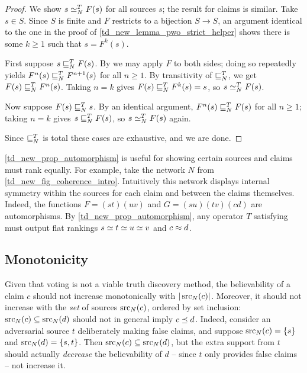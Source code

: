 \begin{proof}
    We show $s \simeq_N^T F(s)$ for all sources $s$; the result for claims is
    similar.
    Take $s \in S$. Since $S$ is finite and $F$ restricts to a bijection $S \to
    S$, an argument identical to the one in the proof of
    \cref{td_new_lemma_pwo_strict_helper} shows there is some $k \ge 1$ such
    that $s = F^k(s)$.

    First suppose $s \sqsubseteq_N^T F(s)$. By \symmetry{} we may apply $F$ to both
    sides; doing so repeatedly yields $F^n(s) \sqsubseteq_N^T F^{n+1}(s)$ for all $n
    \ge 1$. By transitivity of $\sqsubseteq_N^T$, we get $F(s) \sqsubseteq_N^T F^n(s)$.
    Taking $n = k$ gives $F(s) \sqsubseteq_N^T F^k(s) = s$, so $s \simeq_N^T F(s)$.

    Now suppose $F(s) \sqsubseteq_N^T s$. By an identical argument, $F^n(s) \sqsubseteq_N^T
    F(s)$ for all $n \ge 1$; taking $n = k$ gives $s \sqsubseteq_N^T F(s)$, so $s
    \simeq_N^T F(s)$ again.

    Since $\sqsubseteq_N^T$ is total these cases are exhaustive, and we are done.
\end{proof}

\cref{td_new_prop_automorphism} is useful for showing certain sources and
claims must rank equally. For example, take the network $N$ from
\cref{td_new_fig_coherence_intro}. Intuitively this network displays internal
symmetry within the sources for each claim and between the claims themselves.
Indeed, the functions $F = (st)(uv)$ and $G = (su)(tv)(cd)$ are automorphisms.
By \cref{td_new_prop_automorphism}, any operator $T$ satisfying \symmetry{}
must output flat rankings $s \simeq t \simeq u \simeq v$ and $c \approx d$.

\subsection{Monotonicity}

Given that voting is not a viable truth discovery method, the believability of
a claim $c$ should not increase monotonically with $|\operatorname{src}_N(c)|$. Moreover, it
should not increase with the \emph{set} of sources $\operatorname{src}_N(c)$, ordered by set
inclusion: $\operatorname{src}_N(c) \subseteq \operatorname{src}_N(d)$ should not in general imply $c \preceq
d$. Indeed, consider an adversarial source $t$ deliberately making false
claims, and suppose $\operatorname{src}_N(c) = \{s\}$ and $\operatorname{src}_N(d) = \{s, t\}$. Then
$\operatorname{src}_N(c) \subseteq \operatorname{src}_N(d)$, but the extra support from $t$ should actually
\emph{decrease} the believability of $d$ -- since $t$ only provides false
claims -- not increase it.

